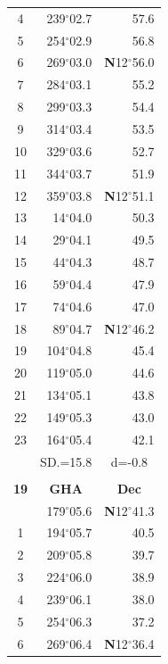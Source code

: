 \documentclass[10pt, a4paper]{report}
\begin{document}
\begin{scriptsize}
\begin{tabular*}{0.2\textwidth}[t]{@{\extracolsep{\fill}}|c|rr|}
4 & 239$^\circ$02.7 & 57.6\\
5 & 254$^\circ$02.9 & 56.8\\[2Pt]
6 & 269$^\circ$03.0 & \textbf{N}12$^\circ$56.0\\
7 & 284$^\circ$03.1 & 55.2\\
8 & 299$^\circ$03.3 & 54.4\\
9 & 314$^\circ$03.4 & \raisebox{0.24ex}{\boldmath$\cdot$~\boldmath$\cdot$~~}53.5\\
10 & 329$^\circ$03.6 & 52.7\\
11 & 344$^\circ$03.7 & 51.9\\[2Pt]
12 & 359$^\circ$03.8 & \textbf{N}12$^\circ$51.1\\
13 & 14$^\circ$04.0 & 50.3\\
14 & 29$^\circ$04.1 & 49.5\\
15 & 44$^\circ$04.3 & \raisebox{0.24ex}{\boldmath$\cdot$~\boldmath$\cdot$~~}48.7\\
16 & 59$^\circ$04.4 & 47.9\\
17 & 74$^\circ$04.6 & 47.0\\[2Pt]
18 & 89$^\circ$04.7 & \textbf{N}12$^\circ$46.2\\
19 & 104$^\circ$04.8 & 45.4\\
20 & 119$^\circ$05.0 & 44.6\\
21 & 134$^\circ$05.1 & \raisebox{0.24ex}{\boldmath$\cdot$~\boldmath$\cdot$~~}43.8\\
22 & 149$^\circ$05.3 & 43.0\\
23 & 164$^\circ$05.4 & 42.1\\
\hline
\rule{0pt}{2.4ex} & \multicolumn{1}{c}{SD.=15.8} & \multicolumn{1}{c|}{d=-0.8}\\
\hline
\multicolumn{1}{c}{}\\[-0.5ex]\hline
\multicolumn{1}{|c|}{\rule{0pt}{2.6ex}\textbf{19}} & \multicolumn{1}{c}{\textbf{GHA}} & \multicolumn{1}{c|}{\textbf{Dec}}\\
\hline\rule{0pt}{2.6ex}\noindent
0 & 179$^\circ$05.6 & \textbf{N}12$^\circ$41.3\\
1 & 194$^\circ$05.7 & 40.5\\
2 & 209$^\circ$05.8 & 39.7\\
3 & 224$^\circ$06.0 & \raisebox{0.24ex}{\boldmath$\cdot$~\boldmath$\cdot$~~}38.9\\
4 & 239$^\circ$06.1 & 38.0\\
5 & 254$^\circ$06.3 & 37.2\\[2Pt]
6 & 269$^\circ$06.4 & \textbf{N}12$^\circ$36.4\\

\end{tabular*}
\end{scriptsize}
\end{document}
